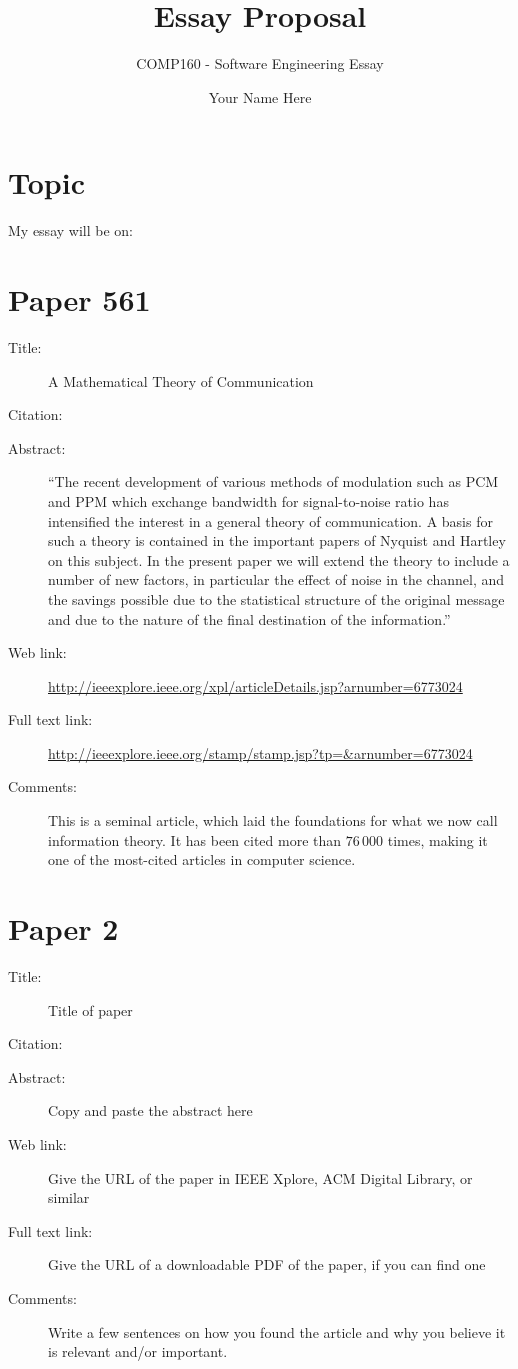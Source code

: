 \documentclass{scrartcl}
\title{Essay Proposal}
\subtitle{COMP160 - Software Engineering Essay}
\author{Your Name Here}
\begin{document}
\maketitle

\section*{Topic}

My essay will be on:


\section*{Paper 561}
\begin{description}
\item[Title:] A Mathematical Theory of Communication
\item[Citation:] \cite{shannon}
\item[Abstract:] ``The recent development of various methods of modulation such as PCM and PPM which exchange bandwidth for signal-to-noise ratio has intensified the interest in a general theory of communication. A basis for such a theory is contained in the important papers of Nyquist and Hartley on this subject. In the present paper we will extend the theory to include a number of new factors, in particular the effect of noise in the channel, and the savings possible due to the statistical structure of the original message and due to the nature of the final destination of the information.''
\item[Web link:] \url{http://ieeexplore.ieee.org/xpl/articleDetails.jsp?arnumber=6773024}
\item[Full text link:] \url{http://ieeexplore.ieee.org/stamp/stamp.jsp?tp=&arnumber=6773024}
\item[Comments:] This is a seminal article, which laid the foundations for what we now call information theory.
	It has been cited more than $76\,000$ times, making it one of the most-cited articles in computer science.
\end{description}

\section*{Paper 2}
\begin{description}
\item[Title:] Title of paper
\item[Citation:] \cite{bibtex_key}
\item[Abstract:] Copy and paste the abstract here
\item[Web link:] Give the URL of the paper in IEEE Xplore, ACM Digital Library, or similar
\item[Full text link:] Give the URL of a downloadable PDF of the paper, if you can find one
\item[Comments:] Write a few sentences on how you found the article and why you believe it is relevant and/or important.
\end{description}
\end{document}
